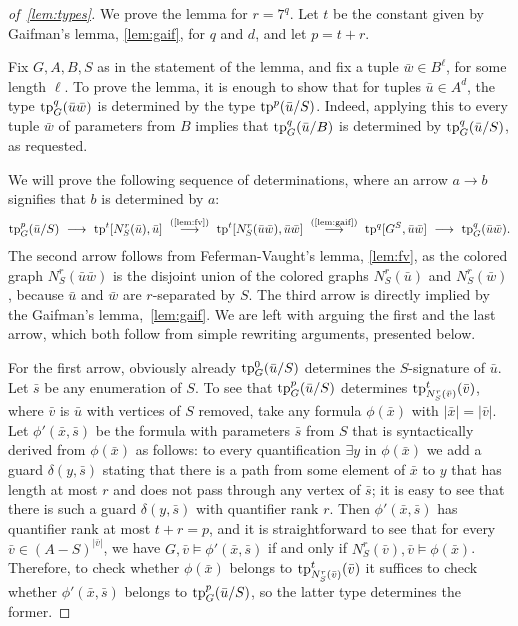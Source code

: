 \begin{proof}[of~\cref{lem:types}]
We prove the lemma for $r=7^q$.
Let $t$ be the constant given by Gaifman's lemma, \cref{lem:gaif}, for $q$ and $d$, and let $p=t+r$.

Fix $G,A,B,S$ as in the statement of the lemma, and fix a tuple $\bar w\in B^\ell$, for some length $\ell$.
To prove the lemma, it is enough to show that
for tuples $\bar u\in A^d$,
the type $\mathrm{tp}^q_G(\bar u\bar w)$ is determined by the type $\mathrm{tp}^p(\bar u/S)$.
Indeed, applying this to every tuple $\bar w$ of parameters from $B$ implies that $\mathrm{tp}^q_G(\bar u/B)$ is determined by $\mathrm{tp}^q_G(\bar u/S)$, as requested.

We will prove the following sequence of determinations,
where an arrow $a\rightarrow b$ signifies that $b$ is determined by $a$:
\begin{align*}
	\tp^p_G(\bar u/S)
  \ \longrightarrow\ 
	\tp^{t}[N^r_S(\bar u), \bar u]
  \ \stackrel{\textrm{(\ref{lem:fv})}}{\longrightarrow}\ 
	\tp^{t}[N^r_S(\bar u\bar w), \bar u\bar w] \ \stackrel{\textrm{(\ref{lem:gaif})}}\longrightarrow\ 
	\tp^q[G^S, \bar u\bar w] \ \longrightarrow\ 
	\tp^q_G(\bar u\bar w).
\end{align*}
The second arrow follows from Feferman-Vaught's lemma, \cref{lem:fv},
as the colored graph $N^r_S(\bar u\bar w)$
is the disjoint union of the colored graphs 
$N^r_S(\bar u)$ and $N^r_S(\bar w)$,
because $\bar u$ and $\bar w$ are $r$-separated by $S$.
The third arrow is directly implied by the Gaifman's lemma,~\cref{lem:gaif}.
We are left with arguing the first and the last arrow, which both follow from simple rewriting arguments, presented below.

\medskip
For the first arrow, obviously already $\mathrm{tp}^0_G(\bar u/S)$ determines the $S$-signature of $\bar u$. Let $\bar s$ be any enumeration of $S$.
To see that $\mathrm{tp}^p_G(\bar u/S)$ determines $\mathrm{tp}^{t}_{N^r_S(\bar v)}(\bar v)$, where $\bar v$ is $\bar u$ with vertices of $S$ removed, take any formula $\phi(\bar x)$ with $|\bar x|=|\bar v|$.
Let $\phi'(\bar x,\bar s)$ be the formula with parameters $\bar s$ from $S$ that is syntactically derived from $\phi(\bar x)$ as follows: 
to every quantification $\exists y$ in $\phi(\bar x)$ we add a guard $\delta(y,\bar s)$ stating that there is a path from some element of $\bar x$ to $y$ that has length at most $r$ and does not pass through
any vertex of $\bar s$; it is easy to see that there is such a guard $\delta(y,\bar s)$ with quantifier rank $r$.
Then $\phi'(\bar x,\bar s)$ has quantifier rank at most $t+r=p$, and it is straightforward to see that for every $\bar v\in (A-S)^{|\bar v|}$, we have $G,\bar v\models \phi'(\bar x,\bar s)$ if and only if
$N^r_S(\bar v),\bar v\models \phi(\bar x)$. Therefore, to check whether $\phi(\bar x)$ belongs to $\mathrm{tp}^{t}_{N^r_S(\bar v)}(\bar v)$ it suffices to check 
whether $\phi'(\bar x,\bar s)$ belongs to $\mathrm{tp}^p_G(\bar u/S)$, so the latter type determines the former.


\end{proof}
